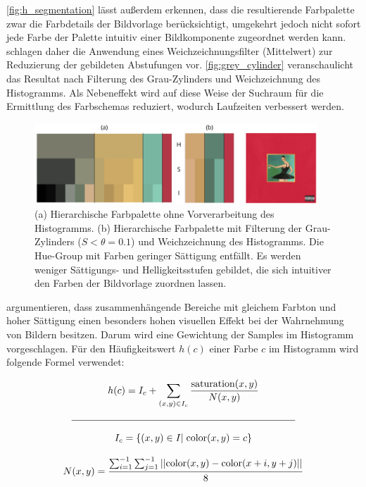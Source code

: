 \autoref{fig:h_segmentation} lässt außerdem erkennen, dass die resultierende Farbpalette zwar die Farbdetails der Bildvorlage berücksichtigt, umgekehrt jedoch nicht sofort jede Farbe der Palette intuitiv einer Bildkomponente zugeordnet werden kann. \citet{image-based-schemes} schlagen daher die Anwendung eines Weichzeichnungsfilter (Mittelwert) zur Reduzierung der gebildeten Abstufungen vor. \autoref{fig:grey_cylinder} veranschaulicht das Resultat nach Filterung des Grau-Zylinders und Weichzeichnung des Histogramms. Als Nebeneffekt wird auf diese Weise der Suchraum für die Ermittlung des Farbschemas reduziert, wodurch Laufzeiten verbessert werden.

\begin{figure}[]
\centering
\includegraphics[width=0.95\textwidth]{img/grey_cylinder.png}
\caption{(a) Hierarchische Farbpalette ohne Vorverarbeitung des Histogramms. (b) Hierarchische Farbpalette mit Filterung der Grau-Zylinders ($S < \theta = 0.1$) und Weichzeichnung des Histogramms. Die Hue-Group mit Farben geringer Sättigung entfällt. Es werden weniger Sättigungs- und Helligkeitsstufen gebildet, die sich intuitiver den Farben der Bildvorlage zuordnen lassen.}
\label{fig:grey_cylinder}
\end{figure}

\citet{image-based-schemes} argumentieren, dass zusammenhängende Bereiche mit gleichem Farbton und hoher Sättigung einen besonders hohen visuellen Effekt bei der Wahrnehmung von Bildern besitzen. Darum wird eine Gewichtung der Samples im Histogramm vorgeschlagen. Für den Häufigkeitswert $h(c)$ einer Farbe $c$ im Histogramm wird folgende Formel verwendet:

\begin{equation}
\begin{gathered}
	h(c) = I_c + \sum_{(x, y) \in I_c} \frac{ \text{saturation}(x, y) }{ N(x, y) }\\
  \mathclap{\rule{8cm}{0.4pt}}\\[2mm] 
  I_c = \{ (x, y) \in I |\; \text{color}(x, y) = c\} \\[3mm] 
  N(x, y) = \frac{ \sum_{i=1}^{-1} \sum_{j=1}^{-1} ||\text{color}(x, y) - \text{color}(x+i, y+j)||}{8}
\end{gathered}
\end{equation}

